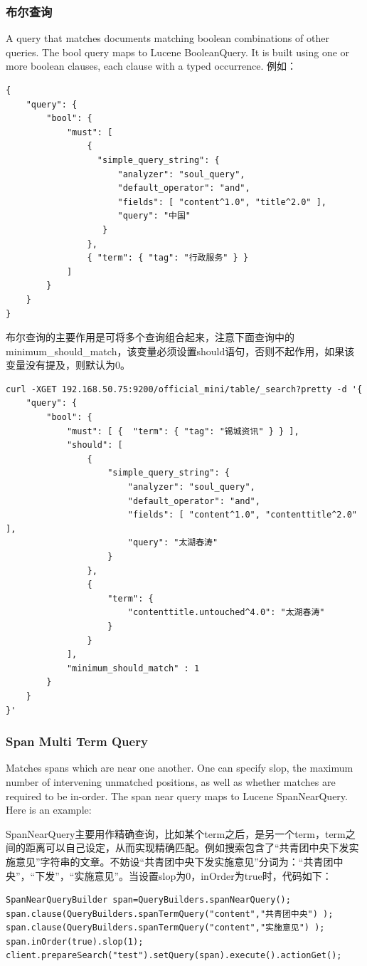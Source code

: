 \subsubsection{布尔查询}
A query that matches documents matching boolean combinations of other queries. The bool query maps to Lucene BooleanQuery. It is built using one or more boolean clauses, each clause with a typed occurrence. 例如：
\begin{verbatim}
{
    "query": {
        "bool": {
            "must": [
                {
                  "simple_query_string": {
                      "analyzer": "soul_query", 
                      "default_operator": "and", 
                      "fields": [ "content^1.0", "title^2.0" ], 
                      "query": "中国"
                   }
                }, 
                { "term": { "tag": "行政服务" } }
            ]
        }
    } 
}
\end{verbatim}
\par 布尔查询的主要作用是可将多个查询组合起来，注意下面查询中的minimum\_should\_match，该变量必须设置should语句，否则不起作用，如果该变量没有提及，则默认为0。
\begin{verbatim}
curl -XGET 192.168.50.75:9200/official_mini/table/_search?pretty -d '{
    "query": {
        "bool": {
            "must": [ {  "term": { "tag": "锡城资讯" } } ], 
            "should": [
                {
                    "simple_query_string": {
                        "analyzer": "soul_query", 
                        "default_operator": "and", 
                        "fields": [ "content^1.0", "contenttitle^2.0" ], 
                        "query": "太湖春涛"
                    }
                }, 
                {
                    "term": {
                        "contenttitle.untouched^4.0": "太湖春涛"
                    }
                }
            ], 
            "minimum_should_match" : 1
        }
    } 
}'
\end{verbatim}
\subsubsection{Span Multi Term Query}
\par Matches spans which are near one another. One can specify slop, the maximum number of intervening unmatched positions, as well as whether matches are required to be in-order. The span near query maps to Lucene SpanNearQuery. Here is an example:
\par SpanNearQuery主要用作精确查询，比如某个term之后，是另一个term，term之间的距离可以自己设定，从而实现精确匹配。例如搜索包含了“共青团中央下发实施意见”字符串的文章。不妨设“共青团中央下发实施意见”分词为：“共青团中央”，“下发”，“实施意见”。当设置slop为0，inOrder为true时，代码如下：
\begin{verbatim}
SpanNearQueryBuilder span=QueryBuilders.spanNearQuery();
span.clause(QueryBuilders.spanTermQuery("content","共青团中央") );
span.clause(QueryBuilders.spanTermQuery("content","实施意见") );
span.inOrder(true).slop(1);
client.prepareSearch("test").setQuery(span).execute().actionGet();
\end{verbatim}
